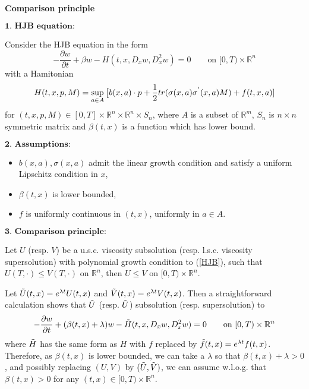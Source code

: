 \documentclass[12pt,a4paper]{ctexart}
\begin{document}
\begin{center}
\textbf{Comparison principle}
\end{center}

\vspace{12pt}

$\textbf{1. HJB equation:}$

Consider the HJB equation in the form
\begin{equation} \label{HJB}
    - \frac{\partial w}{\partial t} + \beta w - H(t, x, D_{x} w, D_{x}^{2} w) = 0 \qquad \text{on} \,\, [0, T) \times \mathbb{R}^{n}
\end{equation}
with a Hamitonian
\begin{equation} \label{Hamitonian}
    H(t,x,p,M) = \sup_{a \in A} \big{[} b(x,a) \cdot p + \frac{1}{2} tr(\sigma(x,a) \sigma^{'}(x,a) M) + f(t,x,a)]
\end{equation}
for $(t,x,p,M) \in [0, T] \times \mathbb{R}^{n} \times \mathbb{R}^{n} \times S_{n}$, where $A$ is a subset of $\mathbb{R}^{m}$, $S_n$ is $n\times n$ symmetric matrix and $\beta(t,x)$ is a function which has lower bound.

\vspace{8pt}

$\textbf{2. Assumptions:}$

\begin{itemize}
    \item $b(x,a), \sigma(x,a)$ admit the linear growth condition and satisfy a uniform Lipschitz condition in $x$,
    \item $\beta(t,x)$ is lower bounded, 
    \item $f$ is uniformly continuous in $(t, x)$, uniformly in $a \in A$.
\end{itemize}


\vspace{8pt}

$\textbf{3. Comparison principle:}$

Let $U$ (resp. $V$) be a u.s.c. viscosity subsolution (resp. l.s.c. viscosity supersolution) with polynomial growth condition to (\ref{HJB}), such that $U(T, \cdot) \leq V(T, \cdot)$ on $\mathbb{R}^{n}$, then $U \leq V$ on $[0, T) \times \mathbb{R}^{n}$.

\vspace{8pt}

 Let $\Tilde{U}(t,x) = e^{\lambda t} U(t,x)$ and $\Tilde{V}(t,x) = e^{\lambda t} V(t,x)$. Then a straightforward calculation shows that $\Tilde{U}$ (resp. $\Tilde{U}$) subsolution (resp. supersolution) to
\begin{equation*}
     - \frac{\partial w}{\partial t} + (\beta(t,x) + \lambda) w - \Tilde{H}(t, x, D_{x} w, D_{x}^{2} w) = 0 \qquad \text{on} \,\, [0, T) \times \mathbb{R}^{n}
\end{equation*}
where $\Tilde{H}$ has the same form as $H$ with $f$ replaced by $\Tilde{f}(t,x) = e^{\lambda t} f(t,x)$. Therefore, as $\beta(t,x)$ is lower bounded, we can take a $\lambda$ so that $\beta(t,x) + \lambda > 0$, and possibly replacing $(U, V)$ by $(\Tilde{U}, \Tilde{V})$, we can assume w.l.o.g. that $\beta(t,x) > 0$ for any $(t,x) \in [0, T) \times \mathbb{R}^{n}$.
\end{document}
